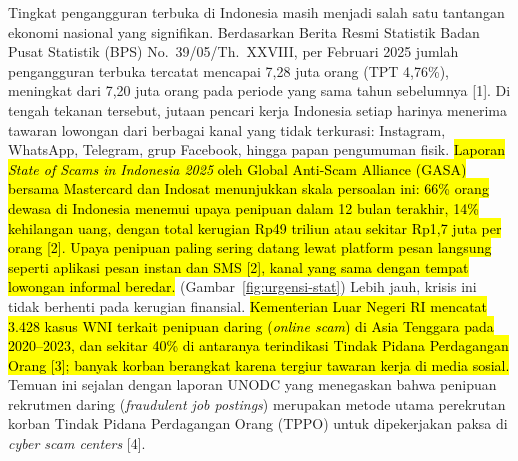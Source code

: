 \documentclass[12pt,a4paper]{article}
\newcommand{\revisi}[1]{\hl{#1}}
\begin{document}
Tingkat pengangguran terbuka di Indonesia masih menjadi salah satu tantangan ekonomi nasional yang
signifikan. Berdasarkan Berita Resmi Statistik Badan Pusat Statistik (BPS) No.\ 39/05/Th.\ XXVIII,
per Februari 2025 jumlah pengangguran terbuka tercatat mencapai 7,28 juta orang (TPT 4,76\%),
meningkat dari 7,20 juta orang pada periode yang sama tahun sebelumnya [1]. Di tengah tekanan
tersebut, jutaan pencari kerja Indonesia setiap harinya menerima tawaran lowongan dari berbagai
kanal yang tidak terkurasi: Instagram, WhatsApp, Telegram, grup Facebook, hingga papan pengumuman
fisik. \revisi{Laporan \textit{State of Scams in Indonesia 2025} oleh Global Anti-Scam Alliance (GASA) bersama
Mastercard dan Indosat menunjukkan skala persoalan ini: 66\% orang dewasa di Indonesia menemui upaya penipuan
dalam 12 bulan terakhir, 14\% kehilangan uang, dengan total kerugian Rp49 triliun atau sekitar Rp1,7 juta per orang [2].
Upaya penipuan paling sering datang lewat platform pesan langsung seperti aplikasi pesan instan dan SMS [2],
kanal yang sama dengan tempat lowongan informal beredar.} (Gambar~\ref{fig:urgensi-stat}) Lebih jauh, krisis ini tidak berhenti pada kerugian finansial.
\revisi{Kementerian Luar Negeri RI mencatat 3.428 kasus WNI terkait penipuan daring (\textit{online scam}) di Asia Tenggara
pada 2020--2023, dan sekitar 40\% di antaranya terindikasi Tindak Pidana Perdagangan Orang [3]; banyak korban
berangkat karena tergiur tawaran kerja di media sosial.} Temuan ini sejalan dengan laporan UNODC yang menegaskan bahwa penipuan rekrutmen daring
(\textit{fraudulent job postings}) merupakan metode utama perekrutan korban Tindak Pidana
Perdagangan Orang (TPPO) untuk dipekerjakan paksa di \textit{cyber scam centers} [4].
\end{document}
